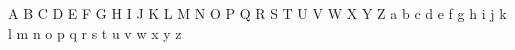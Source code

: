 \noindent\spacer%
A\spacer%
B\spacer%
C\spacer%
D\spacer%
E\spacer%
F\spacer%
G\spacer%
H\spacer%
I\spacer%
J\spacer%
K\spacer%
L\spacer%
M\spacer%
N\spacer%
O\spacer%
P\spacer%
Q\spacer%
R\spacer%
S\spacer%
T\spacer%
U\spacer%
V\spacer%
W\spacer%
X\spacer%
Y\spacer%
Z\spacer%
\null\hspace{0.9ex}\spacer%
a\spacer%
b\spacer%
c\spacer%
d\spacer%
e\spacer%
f\hspace{0.6pt}\spacer%
g\spacer%
h\spacer%
i\spacer%
\hspace{0.8pt}j\spacer%
k\spacer%
l\spacer%
m\spacer%
n\spacer%
o\spacer%
p\spacer%
q\spacer%
r\spacer%
s\spacer%
t\spacer%
u\spacer%
v\spacer%
w\spacer%
x\spacer%
y\spacer%
z\spacer%
